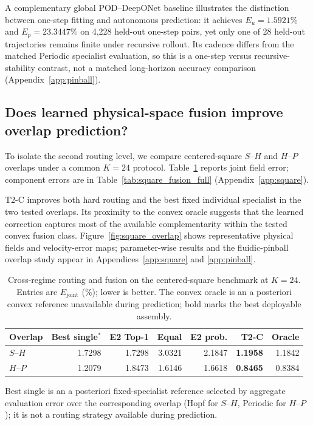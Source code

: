 \noindent A complementary global POD--DeepONet baseline illustrates the
distinction between one-step fitting and autonomous prediction: it achieves
$E_u=1.5921\%$ and $E_p=23.3447\%$ on 4,228 held-out one-step pairs, yet
only one of 28 held-out trajectories remains finite under recursive rollout.
Its cadence differs from the matched Periodic specialist evaluation, so this
is a one-step versus recursive-stability contrast, not a matched long-horizon
accuracy comparison (Appendix~\ref{app:pinball}).

\subsection{Does learned physical-space fusion improve overlap prediction?}

To isolate the second routing level, we compare centered-square $S$--$H$ and
$H$--$P$ overlaps under a common $K=24$ protocol.
Table~\ref{tab:routing_fusion} reports joint field error; component errors are
in Table~\ref{tab:square_fusion_full} (Appendix~\ref{app:square}).

T2-C improves both hard routing and the best fixed individual specialist in
the two tested overlaps. Its proximity to the convex oracle suggests that the learned correction
captures most of the available complementarity within the tested convex
fusion class. Figure~\ref{fig:square_overlap} shows representative physical
fields and velocity-error maps; parameter-wise results and the fluidic-pinball
overlap study appear in Appendices~\ref{app:square} and \ref{app:pinball}.

\begin{table}[t]
\centering
\caption{Cross-regime routing and fusion on the centered-square benchmark at
$K=24$. Entries are $E_{\mathrm{joint}}$ (\%); lower is better.
The convex oracle is an a posteriori convex reference unavailable during prediction;
bold marks the best deployable assembly.}
\label{tab:routing_fusion}
\small
\setlength{\tabcolsep}{5pt}
\begin{threeparttable}
\begin{tabular}{@{}lrrrrrr@{}}
\toprule
Overlap & Best single$^\ast$ & E2 Top-1 & Equal & E2 prob. & T2-C & Oracle \\
\midrule
$S$--$H$ & 1.7298 & 1.7298 & 3.0321 & 2.1847 & \textbf{1.1958} & 1.1842 \\
$H$--$P$ & 1.2079 & 1.8473 & 1.6146 & 1.6618 & \textbf{0.8465} & 0.8384 \\
\bottomrule
\end{tabular}
\begin{tablenotes}[flushleft]
\footnotesize
\item[$\ast$] Best single is an a posteriori fixed-specialist reference selected
by aggregate evaluation error over the corresponding overlap (Hopf for $S$--$H$,
Periodic for $H$--$P$); it is not a routing strategy available during prediction.
\end{tablenotes}
\end{threeparttable}
\end{table}

